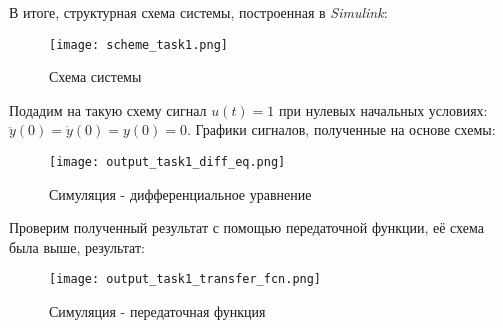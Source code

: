 \newpage
В итоге, структурная схема системы, построенная в \textit{Simulink}:

\begin{figure}[ht]
    \centering
    \texttt{[image: scheme\_task1.png]}
	\caption{Схема системы}
\end{figure}

Подадим на такую схему сигнал $u(t)=1$ при нулевых начальных условиях: $\ddot{y}(0)=\dot{y}(0)=y(0)=0$. Графики сигналов, полученные на основе схемы:
\begin{figure}[ht]
    \centering
    \texttt{[image: output\_task1\_diff\_eq.png]}
	\caption{Симуляция - дифференциальное уравнение}
\end{figure}

Проверим полученный результат с помощью передаточной функции, её схема была выше, результат:
\begin{figure}[ht]
    \centering
    \texttt{[image: output\_task1\_transfer\_fcn.png]}
	\caption{Симуляция - передаточная функция}
\end{figure}


\endinput